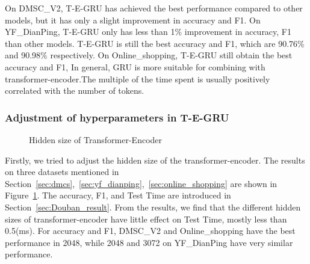 On DMSC\_V2, T-E-GRU has achieved the best performance compared to other models, but it has only a slight improvement in accuracy and F1. 
On YF\_DianPing, 
T-E-GRU only has less than 1\% improvement in accuracy, F1 than other models. 
T-E-GRU is still the best accuracy and F1, which are 90.76\% and 90.98\% respectively. %
On Online\_shopping, T-E-GRU still obtain the best accuracy and F1,
In general, GRU is more suitable for combining with transformer-encoder.The multiple of the time spent is usually positively correlated with the number of tokens.

\subsubsection{Adjustment of hyperparameters in T-E-GRU}

\begin{figure}
	\centering
    \quad
    \quad
	\caption{Hidden size of Transformer-Encoder}
	\label{fig:Hidden_size_Transformer-Encoder}       %
\end{figure}
Firstly, we tried to adjust the hidden size of the transformer-encoder. The results on three datasets mentioned in Section~\ref{sec:dmcs},~\ref{sec:yf_dianping},~\ref{sec:online_shopping} are shown in Figure~\ref{fig:Hidden_size_Transformer-Encoder}. The accuracy, F1, and Test Time are introduced in Section~\ref{sec:Douban_result}. From the results, we find that the different hidden sizes of transformer-encoder have little effect on Test Time, mostly less than 0.5(ms). For accuracy and F1, DMSC\_V2 and Online\_shopping have the best performance in 2048, while 2048 and 3072 on YF\_DianPing have very similar performance.

